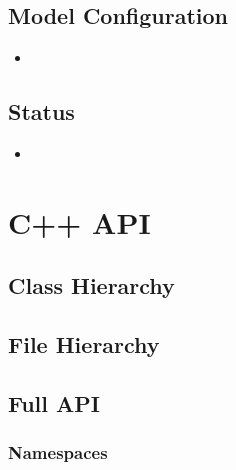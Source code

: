 \documentclass[letterpaper,10pt,english]{sphinxmanual}
\begin{document}
\section{Model Configuration}
\label{\detokenize{protobuf_api/protobuf_api_root:model-configuration}}\begin{itemize}
\item {} 

\end{itemize}


\section{Status}
\label{\detokenize{protobuf_api/protobuf_api_root:status}}\begin{itemize}
\item {} 

\end{itemize}


\chapter{C++ API}
\label{\detokenize{cpp_api/cpp_api_root:c-api}}\label{\detokenize{cpp_api/cpp_api_root::doc}}

\section{Class Hierarchy}
\label{\detokenize{cpp_api/cpp_api_root:class-hierarchy}}



\section{File Hierarchy}
\label{\detokenize{cpp_api/cpp_api_root:file-hierarchy}}



\section{Full API}
\label{\detokenize{cpp_api/cpp_api_root:full-api}}

\subsection{Namespaces}
\label{\detokenize{cpp_api/cpp_api_root:namespaces}}
\end{document}
